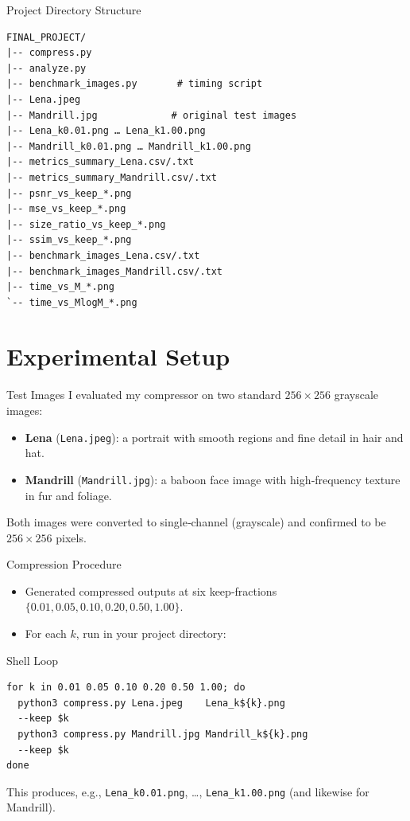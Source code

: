 \documentclass[12pt]{beamer}
\begin{document}
\begin{frame}[fragile]{Project Directory Structure}
\scriptsize
\begin{verbatim}
FINAL_PROJECT/
|-- compress.py
|-- analyze.py
|-- benchmark_images.py       # timing script
|-- Lena.jpeg
|-- Mandrill.jpg             # original test images
|-- Lena_k0.01.png … Lena_k1.00.png
|-- Mandrill_k0.01.png … Mandrill_k1.00.png
|-- metrics_summary_Lena.csv/.txt
|-- metrics_summary_Mandrill.csv/.txt
|-- psnr_vs_keep_*.png
|-- mse_vs_keep_*.png
|-- size_ratio_vs_keep_*.png
|-- ssim_vs_keep_*.png
|-- benchmark_images_Lena.csv/.txt
|-- benchmark_images_Mandrill.csv/.txt
|-- time_vs_M_*.png
`-- time_vs_MlogM_*.png
\end{verbatim}
\normalsize
\end{frame}












\section{Experimental Setup}

\begin{frame}{Test Images}
I evaluated my compressor on two standard $256 \times 256$ grayscale images:
  \begin{itemize}
    \item \textbf{Lena} (\texttt{Lena.jpeg}): a portrait with smooth regions and fine detail in hair and hat.
    \item \textbf{Mandrill} (\texttt{Mandrill.jpg}): a baboon face image with high‑frequency texture in fur and foliage.
  \end{itemize}

  Both images were converted to single‑channel (grayscale) and confirmed to be \(256\times256\) pixels.
\end{frame}


\begin{frame}[fragile]{Compression Procedure}
  \begin{itemize}
    \item Generated compressed outputs at six keep‑fractions
      \(\{0.01,0.05,0.10,0.20,0.50,1.00\}\).
    \item For each \(k\), run in your project directory:
  \end{itemize}

  \begin{block}{Shell Loop}
\begin{verbatim}
for k in 0.01 0.05 0.10 0.20 0.50 1.00; do
  python3 compress.py Lena.jpeg    Lena_k${k}.png    
  --keep $k
  python3 compress.py Mandrill.jpg Mandrill_k${k}.png 
  --keep $k
done
\end{verbatim}
  \end{block}

  This produces, e.g., \texttt{Lena\_k0.01.png}, …, \texttt{Lena\_k1.00.png} (and likewise for Mandrill).
\end{frame}
\end{document}
